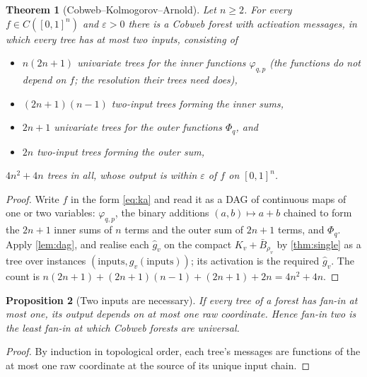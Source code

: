 \documentclass[11pt]{article}
\newtheorem{theorem}{Theorem}
\newtheorem{proposition}[theorem]{Proposition}
\theoremstyle{definition}
\theoremstyle{remark}
\begin{document}
\begin{theorem}[Cobweb--Kolmogorov--Arnold]\label{thm:cka}
Let $n\ge2$.  For every $f\in C([0,1]^n)$ and $\varepsilon>0$ there is a Cobweb forest
with activation messages, in which every tree has at most two inputs, consisting of
\begin{itemize}[leftmargin=*,noitemsep]
\item $n(2n+1)$ univariate trees for the inner functions $\varphi_{q,p}$ (the functions do
  not depend on $f$; the resolution their trees need does),
\item $(2n+1)(n-1)$ two-input trees forming the inner sums,
\item $2n+1$ univariate trees for the outer functions $\Phi_q$, and
\item $2n$ two-input trees forming the outer sum,
\end{itemize}
$4n^2+4n$ trees in all, whose output is within $\varepsilon$ of $f$ on $[0,1]^n$.
\end{theorem}
\begin{proof}
Write $f$ in the form \eqref{eq:ka} and read it as a DAG of continuous maps of one or
two variables: $\varphi_{q,p}$, the binary additions $(a,b)\mapsto a+b$ chained to form
the $2n+1$ inner sums of $n$ terms and the outer sum of $2n+1$ terms, and $\Phi_q$.
Apply \cref{lem:dag}, and realise each $\hat g_v$ on the compact
$K_v+\bar B_{\rho_v}$ by \cref{thm:single} as a tree over instances
$(\text{inputs},g_v(\text{inputs}))$; its activation is the required $\hat g_v$.  The
count is $n(2n+1)+(2n+1)(n-1)+(2n+1)+2n=4n^2+4n$.
\end{proof}

\begin{proposition}[Two inputs are necessary]\label{prop:fanin}
If every tree of a forest has fan-in at most one, its output depends on at most one raw
coordinate.  Hence fan-in two is the least fan-in at which Cobweb forests are universal.
\end{proposition}
\begin{proof}
By induction in topological order, each tree's messages are functions of the at most one
raw coordinate at the source of its unique input chain.
\end{proof}
\end{document}
